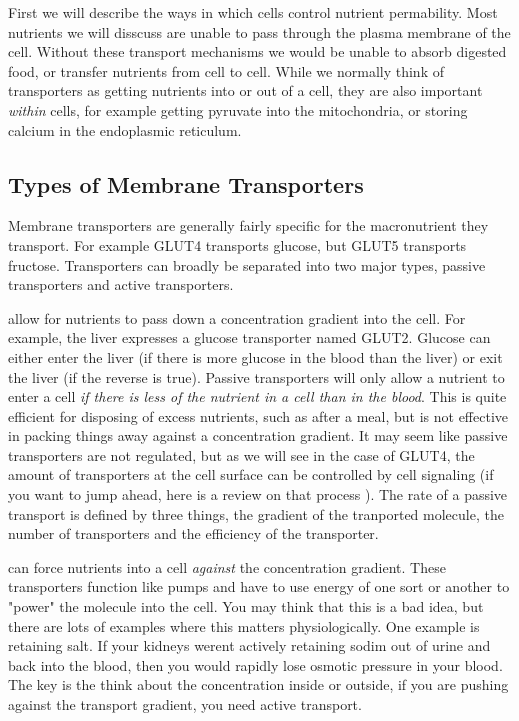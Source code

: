 \documentclass{tufte-handout}
\begin{document}
First we will describe the ways in which cells control nutrient permability.  Most nutrients we will disscuss are unable to pass through the plasma membrane of the cell.  Without these transport mechanisms we would be unable to absorb digested food, or transfer nutrients from cell to cell.  While we normally think of transporters as getting nutrients into or out of a cell, they are also important \emph{within} cells, for example getting pyruvate into the mitochondria, or storing calcium in the endoplasmic reticulum.

\subsection{Types of Membrane Transporters}

Membrane transporters are generally fairly specific for the macronutrient they transport.  For example GLUT4 transports glucose, but GLUT5 transports fructose.  Transporters can broadly be separated into two major types, passive transporters and active transporters.

 allow for nutrients to pass down a concentration gradient into the cell.  For example, the liver expresses a glucose transporter named GLUT2.  Glucose can either enter the liver (if there is more glucose in the blood than the liver) or exit the liver (if the reverse is true).  Passive transporters will only allow a nutrient to enter a cell \emph{if there is less of the nutrient in a cell than in the blood}.  This is quite efficient for disposing of excess nutrients, such as after a meal, but is not effective in packing things away against a concentration gradient.  It may seem like passive transporters are not regulated, but as we will see in the case of GLUT4, the amount of transporters at the cell surface can be controlled by cell signaling (if you want to jump ahead, here is a review on that process \cite{Leto2012}).  The rate of a passive transport is defined by three things, the gradient of the tranported molecule, the number of transporters and the efficiency of the transporter.

 can force nutrients into a cell \emph{against} the concentration gradient.  These transporters function like pumps and have to use energy of one sort or another to "power" the molecule into the cell.  You may think that this is a bad idea, but there are lots of examples where this matters physiologically.  One example is retaining salt.  If your kidneys werent actively retaining sodim out of urine and back into the blood, then you would rapidly lose osmotic pressure in your blood.    The key is the think about the concentration inside or outside, if you are pushing against the transport gradient, you need active transport.
\end{document}
